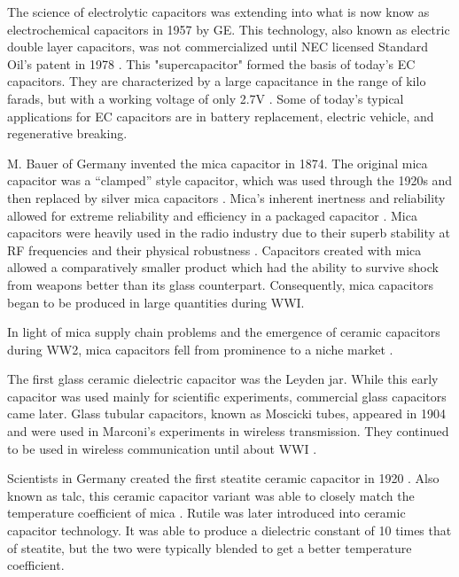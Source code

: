 The science of electrolytic capacitors was extending into what is now know as electrochemical capacitors in 1957 by GE. This technology, also known as electric double layer capacitors, was not commercialized until NEC licensed Standard Oil's patent in 1978 \cite{electrochem_intro}. This "supercapacitor" formed the basis of today's EC capacitors. They are characterized by a large capacitance in the range of kilo farads, but with a working voltage of only 2.7V \cite{electrochem_intro}. Some of today's typical applications for EC capacitors are in battery replacement, electric vehicle, and regenerative breaking.

\nocite{hh}
\nocite{capGuide_mica}
M. Bauer of Germany invented the mica capacitor in 1874. The original mica capacitor was a ``clamped'' style capacitor, which was used through the 1920s \cite{wiki_mica} and then replaced by silver mica capacitors \cite{learn_caps}.
Mica's inherent inertness and reliability allowed for extreme reliability and efficiency in a packaged capacitor \cite{tedds_mica}. Mica capacitors were heavily used in the radio industry due to their superb stability at RF frequencies and their physical robustness \cite{radio_mica}.
Capacitors created with mica allowed a comparatively smaller product \cite[f.~37-41]{dumInv} which had the ability to survive shock from weapons better than its glass counterpart. Consequently, mica capacitors began to be produced in large quantities during WWI.

In light of mica supply chain problems and the emergence of ceramic capacitors during WW2, mica capacitors fell from prominence to a niche market \cite[Ch 3, Sec II]{cerMaterials}.

The first glass ceramic dielectric capacitor was the Leyden jar. While this early capacitor was used mainly for scientific experiments, commercial glass capacitors came later. 
Glass tubular capacitors, known as Moscicki tubes, appeared in 1904 and were used in Marconi's experiments in wireless transmission. They continued to be used in wireless communication until about WWI \cite[p.~102]{dumInv}.

Scientists in Germany created the first steatite ceramic capacitor in 1920 \cite[Ch 3 Sec II]{cerMaterials}\cite{cerDie}. Also known as talc, this ceramic capacitor variant was able to closely match the temperature coefficient of mica \cite{steatite_hf}. Rutile was later introduced into ceramic capacitor technology. It was able to produce a dielectric constant of 10 times that of steatite, but the two were typically blended to get a better temperature coefficient. 

